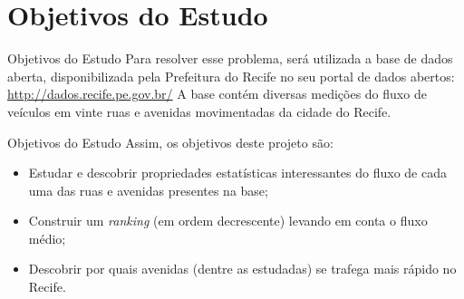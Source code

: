 \section{Objetivos do Estudo}

\begin{frame}{Objetivos do Estudo}
	Para resolver esse problema, será utilizada a base de dados aberta, disponibilizada
    pela Prefeitura do Recife no seu portal de dados abertos:
    \vskip 0.25cm
    \url{http://dados.recife.pe.gov.br/}
    \vskip 0.25cm
    A base contém diversas medições do fluxo de veículos em vinte ruas e avenidas
    movimentadas da cidade do Recife.
    \vskip 2cm
\end{frame}

\begin{frame}{Objetivos do Estudo}
	Assim, os objetivos deste projeto são:
    \begin{itemize}
    \item Estudar e descobrir propriedades estatísticas interessantes do fluxo de cada
    uma das ruas e avenidas presentes na base;
    \item Construir um \textit{ranking} (em ordem decrescente) levando em conta o fluxo
    médio;
    \item Descobrir por quais avenidas (dentre as estudadas) se trafega mais rápido no
    Recife.
    \end{itemize}
    \vskip 1.25cm
\end{frame}
